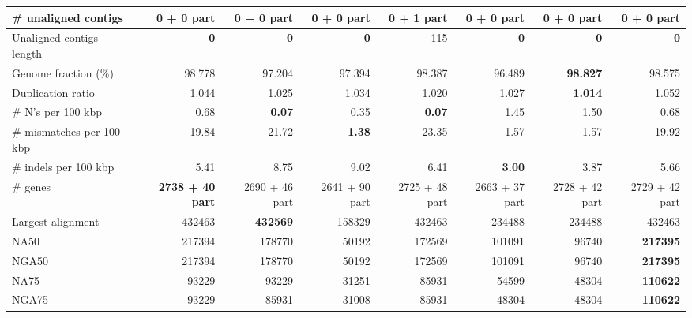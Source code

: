 \documentclass[12pt,a4paper]{article}
\begin{document}
\begin{table}[ht]
\begin{center}
\begin{tabular}{|l*{7}{|r}|}
\# unaligned contigs & {\bf 0 + 0 part} & {\bf 0 + 0 part} & {\bf 0 + 0 part} & 0 + 1 part & {\bf 0 + 0 part} & {\bf 0 + 0 part} & {\bf 0 + 0 part} \\ \hline
Unaligned contigs length & {\bf 0} & {\bf 0} & {\bf 0} & 115 & {\bf 0} & {\bf 0} & {\bf 0} \\ \hline
Genome fraction (\%) & 98.778 & 97.204 & 97.394 & 98.387 & 96.489 & {\bf 98.827} & 98.575 \\ \hline
Duplication ratio & 1.044 & 1.025 & 1.034 & 1.020 & 1.027 & {\bf 1.014} & 1.052 \\ \hline
\# N's per 100 kbp & 0.68 & {\bf 0.07} & 0.35 & {\bf 0.07} & 1.45 & 1.50 & 0.68 \\ \hline
\# mismatches per 100 kbp & 19.84 & 21.72 & {\bf 1.38} & 23.35 & 1.57 & 1.57 & 19.92 \\ \hline
\# indels per 100 kbp & 5.41 & 8.75 & 9.02 & 6.41 & {\bf 3.00} & 3.87 & 5.66 \\ \hline
\# genes & {\bf 2738 + 40 part} & 2690 + 46 part & 2641 + 90 part & 2725 + 48 part & 2663 + 37 part & 2728 + 42 part & 2729 + 42 part \\ \hline
Largest alignment & 432463 & {\bf 432569} & 158329 & 432463 & 234488 & 234488 & 432463 \\ \hline
NA50 & 217394 & 178770 & 50192 & 172569 & 101091 & 96740 & {\bf 217395} \\ \hline
NGA50 & 217394 & 178770 & 50192 & 172569 & 101091 & 96740 & {\bf 217395} \\ \hline
NA75 & 93229 & 93229 & 31251 & 85931 & 54599 & 48304 & {\bf 110622} \\ \hline
NGA75 & 93229 & 85931 & 31008 & 85931 & 48304 & 48304 & {\bf 110622} \\ \hline
\end{tabular}
\end{center}
\end{table}
\end{document}
